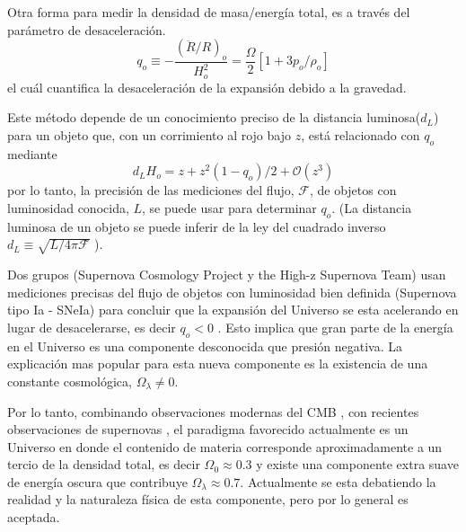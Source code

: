 
Otra forma para medir la densidad de masa/energía total, es a través del parámetro de desaceleración.
\begin{equation*}
    q_o \equiv -\frac{ ( \ddot{R}/R )_o }{H^2_o} = \frac{\Omega}{2}\left[ 1 + 3p_o/\rho_o \right]
\end{equation*}
el cuál cuantifica la desaceleración de la expansión debido a la gravedad.

Este método depende de un conocimiento preciso de la distancia luminosa($d_L$) para un objeto que, con un corrimiento al rojo bajo $z$, está relacionado con $q_o$ mediante
\begin{equation}
    d_LH_o = z +z^2(1-q_o)/2 +\mathcal{O}(z^3)
    \label{eq:dlho}
\end{equation}
por lo tanto, la precisión de las mediciones del flujo, $\mathcal{F}$, de objetos con luminosidad conocida, $L$, se puede usar para determinar $q_o$. (La distancia luminosa de un objeto se puede inferir de la ley del cuadrado inverso $d_L \equiv \sqrt{ L/4\pi\mathcal{F}}$ ).

Dos grupos (Supernova Cosmology Project y the High-z Supernova Team) usan mediciones precisas del flujo de objetos con luminosidad bien definida (Supernova tipo Ia - SNeIa) para concluir que la expansión del Universo se esta acelerando en lugar de desacelerarse, es decir $q_o < 0$ \cite{1998Natur.391...51P, 1998ApJ...507...46S}. Esto implica que gran parte de la energía en el Universo es una componente desconocida que presión negativa. La explicación mas popular para esta nueva componente es la existencia de una constante cosmológica, $\Omega_{\lambda} \neq 0$.%

Por lo tanto, combinando observaciones modernas del CMB \cite{ 2013ApJS..208...20B, 2020A&A...641A...1P } , con recientes observaciones de supernovas \cite{1999ApJ...517..565P, 2006ApJ...644....1C}, el paradigma favorecido actualmente es un Universo en donde el contenido de materia corresponde aproximadamente a un tercio de la densidad total, es decir $\Omega_0 \approx 0.3$ y existe una componente extra suave de energía oscura que contribuye $\Omega_{\lambda} \approx 0.7$. Actualmente se esta debatiendo la realidad y la naturaleza física de esta componente, pero por lo general es aceptada.

